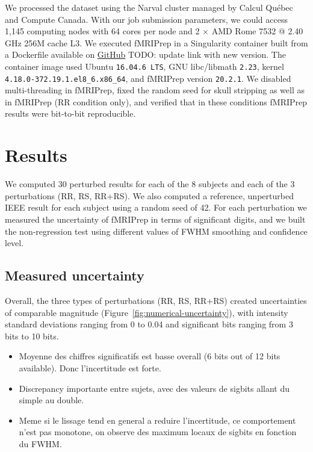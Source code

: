 \documentclass{article}
\newcommand{\TODO}[1]{\color{red}\textsc{TODO:} #1\color{black}\xspace}
\newcommand{\fmriprep}{fMRIPrep \xspace}
\begin{document}
We processed the dataset using the Narval cluster managed by Calcul Qu\'ebec and
Compute Canada. With our job submission parameters, we could access 1,145
computing nodes with 64 cores per node and 2 $\times$ AMD Rome 7532 @ 2.40 GHz
256M cache L3. We executed \fmriprep in a Singularity container built from a
Dockerfile available on
\href{https://github.com/SIMEXP/fmriprep-reproducibility/blob/master/fmriprep-reproducibility/containers/Dockerfile}{GitHub}
\TODO{update link with new version}. The container image used Ubuntu \texttt{16.04.6 LTS}, GNU
libc/libmath \texttt{2.23}, kernel \texttt{4.18.0-372.19.1.el8\_6.x86\_64}, and fMRIPrep version \texttt{20.2.1}. We disabled
multi-threading in fMRIPrep, fixed the random seed for skull stripping as well
as in fMRIPrep (RR condition only), and verified that in these conditions
fMRIPrep results were bit-to-bit reproducible.

\section{Results}

We computed 30 perturbed results for each of the 8 subjects and each of the 3
perturbations (RR, RS, RR+RS). We also computed a reference, unperturbed IEEE
result for each subject using a random seed of 42. For each perturbation we
measured the uncertainty of fMRIPrep in terms of significant digits, and we
built the non-regression test using different values of FWHM smoothing and confidence level.

\subsection{Measured uncertainty}

Overall, the three types of perturbations (RR, RS, RR+RS) created uncertainties
of comparable magnitude (Figure~\ref{fig:numerical-uncertainty}), with intensity
standard deviations ranging from 0 to 0.04 and significant bits ranging from 3
bits to 10 bits.
\begin{itemize}
    \item Moyenne des chiffres significatifs est basse overall (6 bits out of 12
          bits available). Donc l'incertitude est forte.
    \item Discrepancy importante entre sujets, avec des valeurs de sigbits allant du simple au double.
    \item Meme si le lissage tend en general a reduire l'incertitude, ce comportement n'est pas monotone, on observe des maximum locaux de sigbits en fonction du FWHM.
\end{itemize}
\end{document}
